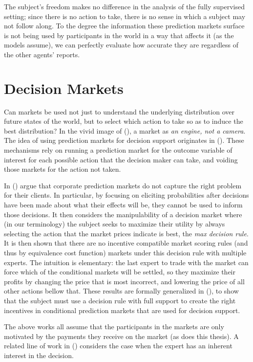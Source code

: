 The subject's freedom makes no difference in the analysis of the fully supervised setting; since there is no action to take, there is no sense in which a subject may not follow along. To the degree the information these prediction markets surface is not being used by participants in the world in a way that affects it (as the models assume), we can perfectly evaluate how accurate they are regardless of the other agents' reports.


\section{Decision Markets}

Can markets be used not just to understand the underlying distribution over future states of the world, but to select which action to take so as to induce the best distribution? In the vivid image of (\cite{mackenzie2008engine}), a market as \emph{an engine, not a camera}.
The idea of using prediction markets for decision support originates in (\cite{berg2003prediction,hanson2002decision}). 
These mechanisms rely on running a prediction market for the outcome variable of interest for each possible action that the decision maker can take, and voiding those markets for the action not taken.

In (\cite{othman2010decision}) argue that corporate prediction markets do not capture the right problem for their clients. In particular, by focusing on eliciting probabilities after decisions have been made about what their effects will be, they cannot be used to inform those decisions. It then considers the manipulability of a decision market where (in our terminology) the subject seeks to maximize their utility by always selecting the action that the market prices indicate is best, the \emph{max decision rule}. It is then shown that there are no incentive compatible market scoring rules (and thus by equivalence cost function) markets under this decision rule with multiple experts.
The intuition is elementary: the last expert to trade with the market can force which of the conditional markets will be settled, so they maximize their profits by changing the price that is most incorrect, and lowering the price of all other actions bellow that.
These results are formally generalized in (\cite{chen2014eliciting}), to show that the subject must use a decision rule with full support to create the right incentives in conditional prediction markets that are used for decision support.

The above works all assume that the participants in the markets are only motivated by the payments they receive on the market (as does this thesis). A related line of work in (\cite{boutilier2012eliciting}) considers the case when the expert has an inherent interest in the decision. 



